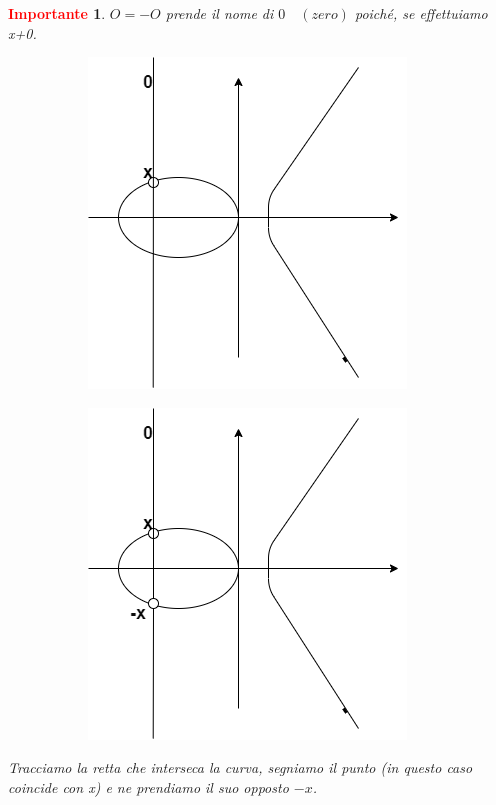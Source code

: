 \documentclass{book}
\newtheorem*{Importante}{\textbf{\textcolor{red}{Importante}}}
\begin{document}
\begin{Importante}
	\(O=-O\) prende il nome di \(0\quad (zero)\) poiché, se effettuiamo x+0.
	\begin{figure}[ht]
		\begin{subfigure}[l]{0.4\textwidth}
			\centering
		\includegraphics[scale=0.4]{ECaddition5.png}
		\end{subfigure}
		\begin{subfigure}[l]{0.4\textwidth}
			\centering
		\includegraphics[scale=0.4]{ECaddition6.png}
		\end{subfigure}
	\end{figure}
	Tracciamo la retta che interseca la curva, segniamo il punto (\emph{in questo caso coincide con x}) e ne prendiamo il suo opposto \(-x\).
\end{Importante}
\end{document}
